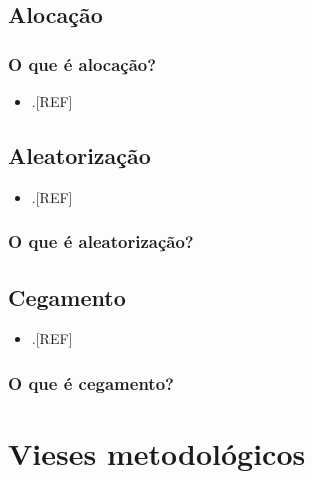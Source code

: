 \documentclass[
]{book}
\providecommand{\tightlist}{%
  \setlength{\itemsep}{0pt}\setlength{\parskip}{0pt}}
\begin{document}
\hypertarget{alocacao}{%
\section{Alocação}\label{alocacao}}

\hypertarget{o-que-uxe9-alocauxe7uxe3o}{%
\subsection{O que é alocação?}\label{o-que-uxe9-alocauxe7uxe3o}}

\begin{itemize}
\tightlist
\item
  .{[}REF{]}
\end{itemize}

\hypertarget{aleatorizauxe7uxe3o}{%
\section{Aleatorização}\label{aleatorizauxe7uxe3o}}

\begin{itemize}
\tightlist
\item
  .{[}REF{]}
\end{itemize}

\hypertarget{o-que-uxe9-aleatorizauxe7uxe3o}{%
\subsection{O que é aleatorização?}\label{o-que-uxe9-aleatorizauxe7uxe3o}}

\hypertarget{cegamento}{%
\section{Cegamento}\label{cegamento}}

\begin{itemize}
\tightlist
\item
  .{[}REF{]}
\end{itemize}

\hypertarget{o-que-uxe9-cegamento}{%
\subsection{O que é cegamento?}\label{o-que-uxe9-cegamento}}

\hypertarget{vieses-metodologicos}{%
\chapter{\texorpdfstring{\textbf{Vieses metodológicos}}{Vieses metodológicos}}\label{vieses-metodologicos}}
\end{document}
